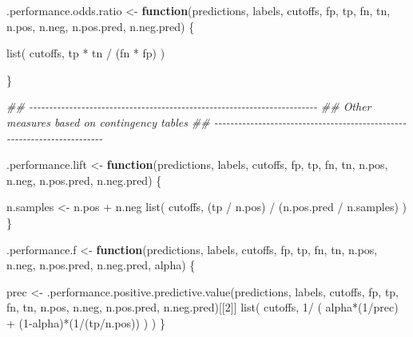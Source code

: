 \documentclass[
  letterpaper,
  DIV=11,
  numbers=noendperiod]{scrartcl}
\newenvironment{Shaded}{\begin{snugshade}}{\end{snugshade}}
\newcommand{\ControlFlowTok}[1]{\textcolor[rgb]{0.00,0.23,0.31}{\textbf{#1}}}
\newcommand{\DecValTok}[1]{\textcolor[rgb]{0.68,0.00,0.00}{#1}}
\newcommand{\DocumentationTok}[1]{\textcolor[rgb]{0.37,0.37,0.37}{\textit{#1}}}
\newcommand{\FunctionTok}[1]{\textcolor[rgb]{0.28,0.35,0.67}{#1}}
\newcommand{\NormalTok}[1]{\textcolor[rgb]{0.00,0.23,0.31}{#1}}
\newcommand{\OtherTok}[1]{\textcolor[rgb]{0.00,0.23,0.31}{#1}}
\newcommand{\SpecialCharTok}[1]{\textcolor[rgb]{0.37,0.37,0.37}{#1}}
\begin{document}
\begin{Shaded}
\begin{Highlighting}[]
\NormalTok{.performance.odds.ratio }\OtherTok{\textless{}{-}} 
  \ControlFlowTok{function}\NormalTok{(predictions, labels, cutoffs, fp, tp, fn, tn,}
\NormalTok{           n.pos, n.neg, n.pos.pred, n.neg.pred) \{}
      

    \FunctionTok{list}\NormalTok{( cutoffs, tp }\SpecialCharTok{*}\NormalTok{ tn }\SpecialCharTok{/}\NormalTok{ (fn }\SpecialCharTok{*}\NormalTok{ fp) )}
    
\NormalTok{\}}

\DocumentationTok{\#\# {-}{-}{-}{-}{-}{-}{-}{-}{-}{-}{-}{-}{-}{-}{-}{-}{-}{-}{-}{-}{-}{-}{-}{-}{-}{-}{-}{-}{-}{-}{-}{-}{-}{-}{-}{-}{-}{-}{-}{-}{-}{-}{-}{-}{-}{-}{-}{-}{-}{-}{-}{-}{-}{-}{-}{-}{-}{-}{-}{-}{-}{-}{-}{-}{-}{-}{-}{-}{-}{-}{-}{-}}
\DocumentationTok{\#\# Other measures based on contingency tables}
\DocumentationTok{\#\# {-}{-}{-}{-}{-}{-}{-}{-}{-}{-}{-}{-}{-}{-}{-}{-}{-}{-}{-}{-}{-}{-}{-}{-}{-}{-}{-}{-}{-}{-}{-}{-}{-}{-}{-}{-}{-}{-}{-}{-}{-}{-}{-}{-}{-}{-}{-}{-}{-}{-}{-}{-}{-}{-}{-}{-}{-}{-}{-}{-}{-}{-}{-}{-}{-}{-}{-}{-}{-}{-}{-}{-}}

\NormalTok{.performance.lift }\OtherTok{\textless{}{-}}
  \ControlFlowTok{function}\NormalTok{(predictions, labels, cutoffs, fp, tp, fn, tn,}
\NormalTok{           n.pos, n.neg, n.pos.pred, n.neg.pred) \{}
      
\NormalTok{      n.samples }\OtherTok{\textless{}{-}}\NormalTok{ n.pos }\SpecialCharTok{+}\NormalTok{ n.neg}
      \FunctionTok{list}\NormalTok{( cutoffs, (tp }\SpecialCharTok{/}\NormalTok{ n.pos) }\SpecialCharTok{/}\NormalTok{ (n.pos.pred }\SpecialCharTok{/}\NormalTok{ n.samples) )}
\NormalTok{  \}}

\NormalTok{.performance.f }\OtherTok{\textless{}{-}}
  \ControlFlowTok{function}\NormalTok{(predictions, labels, cutoffs, fp, tp, fn, tn,}
\NormalTok{           n.pos, n.neg, n.pos.pred, n.neg.pred, alpha) \{}

\NormalTok{      prec }\OtherTok{\textless{}{-}} \FunctionTok{.performance.positive.predictive.value}\NormalTok{(predictions, labels,}
\NormalTok{                                                     cutoffs, fp, tp, fn, tn,}
\NormalTok{                                                     n.pos, n.neg, n.pos.pred,}
\NormalTok{                                                     n.neg.pred)[[}\DecValTok{2}\NormalTok{]]}
      \FunctionTok{list}\NormalTok{( cutoffs,  }\DecValTok{1}\SpecialCharTok{/}\NormalTok{ ( alpha}\SpecialCharTok{*}\NormalTok{(}\DecValTok{1}\SpecialCharTok{/}\NormalTok{prec) }\SpecialCharTok{+}\NormalTok{ (}\DecValTok{1}\SpecialCharTok{{-}}\NormalTok{alpha)}\SpecialCharTok{*}\NormalTok{(}\DecValTok{1}\SpecialCharTok{/}\NormalTok{(tp}\SpecialCharTok{/}\NormalTok{n.pos))  ) )}
\NormalTok{  \}}


\end{Highlighting}
\end{Shaded}
\end{document}
